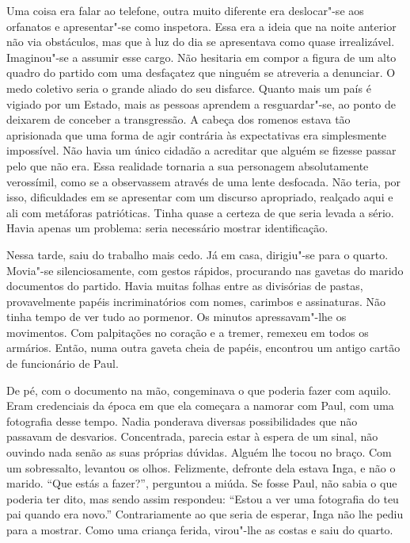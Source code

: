 Uma coisa era falar ao telefone, outra muito diferente era deslocar"-se
aos orfanatos e apresentar"-se como inspetora. Essa era a ideia que na
noite anterior não via obstáculos, mas que à luz do dia se apresentava
como quase irrealizável. Imaginou"-se a assumir esse cargo. Não hesitaria em compor a figura de um alto quadro do partido com uma desfaçatez
que ninguém se atreveria a denunciar. O medo coletivo seria o grande
aliado do seu disfarce. Quanto mais um país é vigiado por um Estado,
mais as pessoas aprendem a resguardar"-se, ao ponto de deixarem de
conceber a transgressão. A cabeça dos romenos estava tão aprisionada que
uma forma de agir contrária às expectativas era simplesmente
impossível. Não havia um único cidadão a acreditar que alguém se fizesse
passar pelo que não era. Essa realidade tornaria a sua personagem
absolutamente verossímil, como se a observassem através de uma lente desfocada.
Não teria, por isso, dificuldades em se apresentar com um discurso
apropriado, realçado aqui e ali com metáforas patrióticas. Tinha quase a
certeza de que seria levada a sério. Havia apenas um problema: seria
necessário mostrar identificação.

Nessa tarde, saiu do trabalho mais cedo. Já em casa, dirigiu"-se para o
quarto. Movia"-se silenciosamente, com gestos rápidos, procurando nas
gavetas do marido documentos do partido. Havia muitas folhas entre as
divisórias de pastas, provavelmente papéis incriminatórios com nomes,
carimbos e assinaturas. Não tinha tempo de ver tudo ao pormenor. Os
minutos apressavam"-lhe os movimentos. Com palpitações no coração e a
tremer, remexeu em todos os armários. Então, numa outra gaveta cheia de
papéis, encontrou um antigo cartão de funcionário de Paul.

De pé, com o documento na mão, congeminava o que poderia fazer com
aquilo. Eram credenciais da época em que ela começara a namorar com
Paul, com uma fotografia desse tempo. Nadia ponderava diversas
possibilidades que não passavam de desvarios. Concentrada, parecia estar
à espera de um sinal, não ouvindo nada senão as suas próprias dúvidas.
Alguém lhe tocou no braço. Com um sobressalto, levantou os olhos.
Felizmente, defronte dela estava Inga, e não o marido. ``Que estás a
fazer?'', perguntou a miúda. Se fosse Paul, não sabia o que poderia ter
dito, mas sendo assim respondeu: ``Estou a ver uma fotografia do teu pai
quando era novo.'' Contrariamente ao que seria de esperar, Inga não lhe
pediu para a mostrar.
Como uma criança ferida, virou"-lhe as costas e saiu do quarto.

